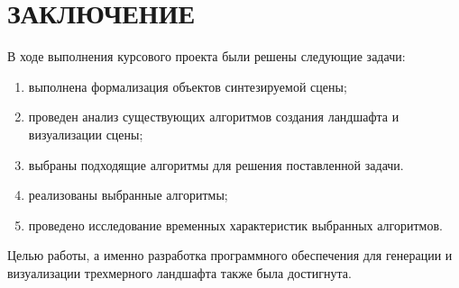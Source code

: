 \chapter*{ЗАКЛЮЧЕНИЕ}

В ходе выполнения курсового проекта были решены следующие задачи: 

\begin{enumerate}[label={\arabic*)}]
	\item выполнена формализация объектов синтезируемой сцены;
	\item проведен анализ существующих алгоритмов создания ландшафта и визуализации сцены;
	\item выбраны подходящие алгоритмы для решения поставленной задачи.
	\item реализованы выбранные алгоритмы;
	\item проведено исследование временных характеристик выбранных алгоритмов.
\end{enumerate}


Целью работы, а именно разработка программного обеспечения для генерации и визуализации трехмерного ландшафта также была достигнута.
